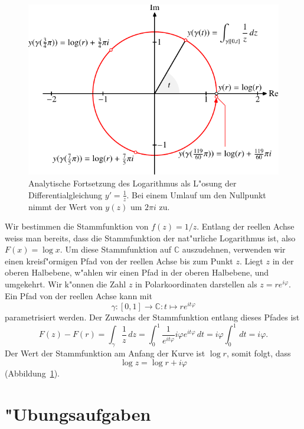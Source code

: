 \begin{beispiel}
\begin{figure}
\centering
\includegraphics{chapters/images/komplex-5.pdf}
\caption{Analytische Fortsetzung des Logarithmus als L"osung der
Differentialgleichung $y'=\frac1z$.
Bei einem Umlauf um den Nullpunkt nimmt der Wert von $y(z)$ um
$2\pi i$ zu.
\label{komplex:analytische-fortsetzung-log}
}
\end{figure}
Wir bestimmen die Stammfunktion von $f(z)=1/z$.
Entlang der reellen Achse weiss man bereits, dass die Stammfunktion
der nat"urliche Logarithmus ist, also $F(x)=\log x$.
Um diese Stammfunktion auf $\mathbb C$ auszudehnen, verwenden wir einen
kreisf"ormigen Pfad von der reellen Achse bis zum Punkt $z$.
Liegt $z$ in der oberen Halbebene, w"ahlen wir einen Pfad in der
oberen Halbebene, und umgekehrt.
Wir k"onnen die Zahl $z$ in Polarkoordinaten darstellen als $z=re^{i\varphi}$.
Ein Pfad von der reellen Achse kann mit
\[
\gamma\colon [0,1]\to\mathbb C: t\mapsto re^{it\varphi}
\]
parametrisiert werden.
Der Zuwachs der Stammfunktion entlang dieses Pfades ist
\[
F(z)-F(r)
=
\int_\gamma\frac1z\,dz
=
\int_0^1 \frac1{e^{it\varphi}}i\varphi e^{it\varphi}\,dt
=
i\varphi \int_0^1\,dt
=
i\varphi.
\]
Der Wert der Stammfunktion am Anfang der Kurve ist $\log r$, somit
folgt, dass
\[
\log z = \log r + i\varphi
\]
(Abbildung~\ref{komplex:analytische-fortsetzung-log}).
\end{beispiel}

\section{"Ubungsaufgaben}


